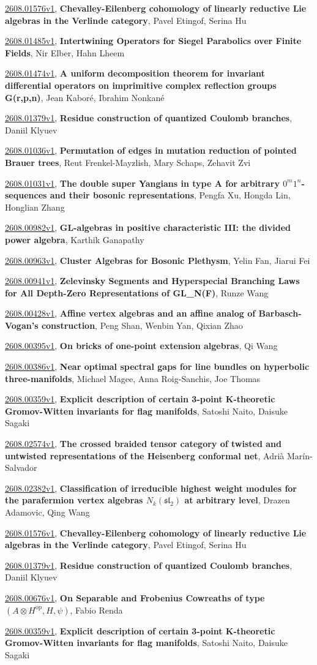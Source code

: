 \documentclass[9pt, a4paper]{article}
\theoremstyle{plain}
\theoremstyle{definition}
\theoremstyle{remark}
\newcommand{\arxiv}[3]{\href{https://arxiv.org/abs/#1}{#1}, \textbf{\textcolor{arxivblue}{#2}}, #3}
\begin{document}
\arxiv{2608.01576v1}{Chevalley-Eilenberg cohomology of linearly reductive Lie algebras in the Verlinde category}{Pavel Etingof, Serina Hu}

\arxiv{2608.01485v1}{Intertwining Operators for Siegel Parabolics over Finite Fields}{Nir Elber, Hahn Lheem}

\arxiv{2608.01474v1}{A uniform decomposition theorem for invariant differential operators on imprimitive complex reflection groups G(r,p,n)}{Jean Kaboré, Ibrahim Nonkané}

\arxiv{2608.01379v1}{Residue construction of quantized Coulomb branches}{Daniil Klyuev}

\arxiv{2608.01036v1}{Permutation of edges in mutation reduction of pointed Brauer trees}{Reut Frenkel-Mayzlish, Mary Schaps, Zehavit Zvi}

\arxiv{2608.01031v1}{The double super Yangians in type A for arbitrary $0^m 1^n$-sequences and their bosonic representations}{Pengfa Xu, Hongda Lin, Honglian Zhang}

\arxiv{2608.00982v1}{GL-algebras in positive characteristic III: the divided power algebra}{Karthik Ganapathy}

\arxiv{2608.00963v1}{Cluster Algebras for Bosonic Plethysm}{Yelin Fan, Jiarui Fei}

\arxiv{2608.00941v1}{Zelevinsky Segments and Hyperspecial Branching Laws for All Depth-Zero Representations of GL_N(F)}{Runze Wang}

\arxiv{2608.00428v1}{Affine vertex algebras and an affine analog of Barbasch-Vogan's construction}{Peng Shan, Wenbin Yan, Qixian Zhao}

\arxiv{2608.00395v1}{On bricks of one-point extension algebras}{Qi Wang}

\arxiv{2608.00386v1}{Near optimal spectral gaps for line bundles on hyperbolic three-manifolds}{Michael Magee, Anna Roig-Sanchis, Joe Thomas}

\arxiv{2608.00359v1}{Explicit description of certain 3-point K-theoretic Gromov-Witten invariants for flag manifolds}{Satoshi Naito, Daisuke Sagaki}

\arxiv{2608.02574v1}{The crossed braided tensor category of twisted and untwisted representations of the Heisenberg conformal net}{Adrià Marín-Salvador}

\arxiv{2608.02382v1}{Classification of irreducible highest weight modules for the parafermion vertex algebras $N_k(\mathfrak{sl}_2)$ at arbitrary level}{Drazen Adamovic, Qing Wang}

\arxiv{2608.01576v1}{Chevalley-Eilenberg cohomology of linearly reductive Lie algebras in the Verlinde category}{Pavel Etingof, Serina Hu}

\arxiv{2608.01379v1}{Residue construction of quantized Coulomb branches}{Daniil Klyuev}

\arxiv{2608.00676v1}{On Separable and Frobenius Cowreaths of type $(A \otimes H^{\mathrm{op}}, H,ψ)$}{Fabio Renda}

\arxiv{2608.00359v1}{Explicit description of certain 3-point K-theoretic Gromov-Witten invariants for flag manifolds}{Satoshi Naito, Daisuke Sagaki}

\end{document}
